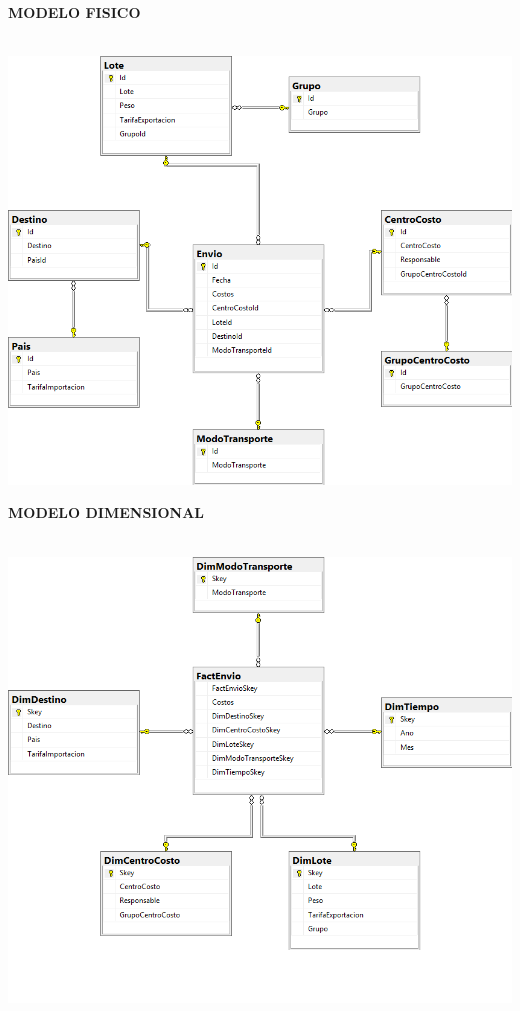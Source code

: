 
\textbf{MODELO FISICO}\\\\
\begin{center}
\includegraphics[width=\columnwidth]{images/task1/e1}\newline
\end{center}

\textbf{MODELO DIMENSIONAL}\\\\
\begin{center}
\includegraphics[width=\columnwidth]{images/task1/d1}\newline
\end{center}


